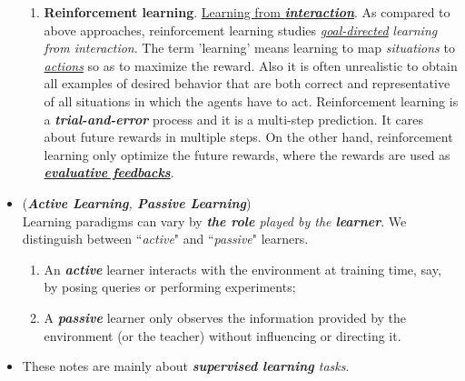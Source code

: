 \documentclass[11pt]{article}
\begin{document}
\begin{itemize}
\begin{remark}
\begin{enumerate}
\item \textbf{Reinforcement learning}. \underline{Learning from \emph{\textbf{interaction}}}. As compared to above approaches,  reinforcement learning studies \underline{\emph{goal-directed}} \emph{learning from interaction}. The term 'learning' means learning to map \emph{situations} to  \underline{\emph{actions}} so as to maximize the reward. Also it is often unrealistic to obtain all examples of desired behavior that are both correct and representative of all situations in which the agents have to act. Reinforcement learning is a \textbf{\emph{trial-and-error}} process and it is a multi-step prediction. It cares about future rewards in multiple steps. On the other hand, reinforcement learning only optimize the future rewards, where the rewards are used as  \underline{\textbf{\emph{evaluative feedbacks}}}.  
\end{enumerate}
\end{remark}

\item  \begin{remark} (\emph{\textbf{Active Learning}, \textbf{Passive Learning}}) \\
Learning paradigms can vary by \emph{\textbf{the role} played by the \textbf{learner}}. We distinguish between ``\emph{active}" and ``\emph{passive}"  learners. 
\begin{enumerate}
\item An \emph{\textbf{active}} learner interacts with the environment at training time, say, by posing queries or performing experiments;
\item A \emph{\textbf{passive}} learner only observes the information provided by the environment (or the teacher) without influencing or directing it.
\end{enumerate}  
\end{remark}

%
%

\item These notes are mainly about \emph{\textbf{supervised learning} tasks}.  
\end{itemize}
\end{document}
